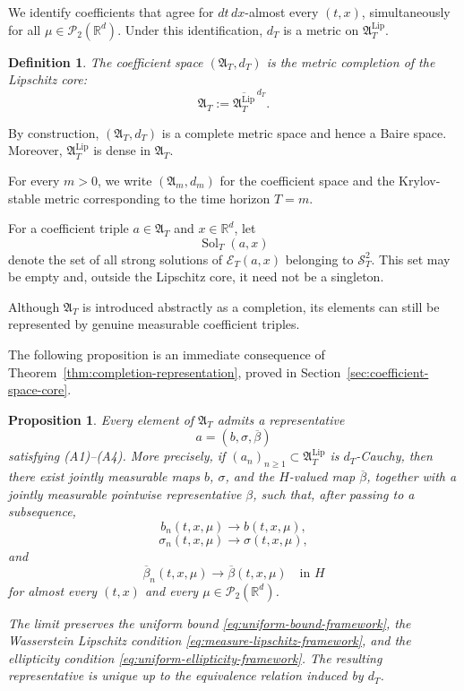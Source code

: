 \documentclass[12pt,oneside, reqno]{amsart}
\newtheorem{definition}[theorem]{Definition}
\newtheorem{proposition}[theorem]{Proposition}
\numberwithin{equation}{section}
\begin{document}
	We identify coefficients that agree for $dt\,dx$-almost every $(t,x)$, simultaneously for all
	$\mu\in\mathcal P_2(\mathbb R^d)$. Under this identification, $d_T$ is a metric on $\mathfrak A_T^{\mathrm{Lip}}$.
	
	
	
	\begin{definition}
		\label{def:complete-coefficient-space}
		The coefficient space $(\mathfrak A_T,d_T)$ is the metric
		completion of the Lipschitz core:
		\begin{equation}
			\label{eq:completion-definition}
			\mathfrak A_T:=\overline{\mathfrak A_T^{\mathrm{Lip}}}^{\,d_T}.
		\end{equation}
	\end{definition}
	
	By construction, $(\mathfrak A_T,d_T)$ is a complete metric space and hence a Baire space. Moreover, $\mathfrak A_T^{\mathrm{Lip}}$ is dense in $\mathfrak A_T$.
	
	For every $m>0$, we write $(\mathfrak A_m,d_m)$ for the coefficient
	space and the Krylov-stable metric corresponding to the time horizon
	$T=m$.
	
	For a coefficient triple $a\in\mathfrak A_T$ and $x\in\mathbb R^d$,
	let
	\[
	\operatorname{Sol}_T(a,x)
	\]
	denote the set of all strong solutions of $\mathcal E_T(a,x)$ belonging
	to $\mathcal S_T^2$. This set may be empty and, outside the Lipschitz
	core, it need not be a singleton.
	
	Although $\mathfrak A_T$ is introduced abstractly as a completion, its elements can still be represented by genuine measurable coefficient triples.
	
	The following proposition  is an immediate consequence of Theorem~\ref{thm:completion-representation}, proved in Section~\ref{sec:coefficient-space-core}.
	\begin{proposition}
		\label{prop:coefficient-representation}
		Every element of $\mathfrak A_T$ admits a representative
		\[
		a=(b,\sigma,\overline\beta)
		\]
		satisfying \textnormal{(A1)}--\textnormal{(A4)}. More precisely, if	$(a_n)_{n\geq 1}\subset\mathfrak A_T^{\mathrm{Lip}}$ is	$d_T$-Cauchy, then there exist jointly measurable maps	$b$, $\sigma$, and the $H$-valued map $\overline\beta$, together with a jointly measurable pointwise representative $\beta$, such that, after passing to a subsequence,
		\[
		b_n(t,x,\mu)\longrightarrow b(t,x,\mu),
		\]
		\[
		\sigma_n(t,x,\mu)\longrightarrow\sigma(t,x,\mu),
		\]
		and
		\[
		\overline\beta_n(t,x,\mu)
		\longrightarrow\overline\beta(t,x,\mu)
		\quad\text{in }H
		\]
		for almost every $(t,x)$ and every	$\mu\in\mathcal P_2(\mathbb R^d)$.
		
		The limit preserves the uniform bound	\eqref{eq:uniform-bound-framework}, the Wasserstein Lipschitz condition \eqref{eq:measure-lipschitz-framework}, and the	ellipticity condition \eqref{eq:uniform-ellipticity-framework}.	The resulting representative is unique up to the equivalence	relation induced by $d_T$.
	\end{proposition}
	
\end{document}
